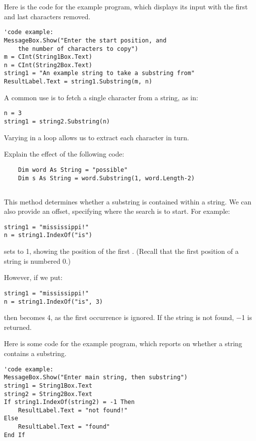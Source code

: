 			Here is the code for the example program, which displays its input with the first and last characters removed.
			\begin{lstlisting}
'code example:
MessageBox.Show("Enter the start position, and 
	the number of characters to copy")
m = CInt(String1Box.Text)
n = CInt(String2Box.Text)
string1 = "An example string to take a substring from"
ResultLabel.Text = string1.Substring(m, n)
			\end{lstlisting}
			A common use is to fetch a single character from a string, as in:
			\begin{lstlisting}
n = 3
string1 = string2.Substring(n)
		  \end{lstlisting}
			Varying  in a loop allows us to extract each character in turn.
			
		\begin{stqb}
			\begin{STQ}
			\item Explain the effect of the following code:
				\begin{lstlisting}
	Dim word As String = "possible"
	Dim s As String = word.Substring(1, word.Length-2)
				\end{lstlisting}
			\end{STQ}
		\end{stqb}

		\subsection*{}
			This method determines whether a substring is contained within a string. We can also provide an offset, specifying where the search is to start. For example:
 			\begin{lstlisting}
string1 = "mississippi!"
n = string1.IndexOf("is")
			\end{lstlisting}
			sets  to 1, showing the position of the first . (Recall that the first position of a string is numbered 0.)
			
			However, if we put:
			\begin{lstlisting}
string1 = "mississippi!"
n = string1.IndexOf("is", 3)
			\end{lstlisting}
			then  becomes 4, as the first occurrence is ignored. If the string is not found, −1 is returned.
			
			Here is some code for the example program, which reports on whether a string contains a substring.
			\begin{lstlisting}
'code example:
MessageBox.Show("Enter main string, then substring")
string1 = String1Box.Text
string2 = String2Box.Text
If string1.IndexOf(string2) = -1 Then
	ResultLabel.Text = "not found!"
Else
	ResultLabel.Text = "found"
End If
			\end{lstlisting}

